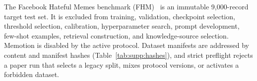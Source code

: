 The Facebook Hateful Memes benchmark (FHM)~\cite{kiela2020hateful} is an
immutable 9,000-record target test set.  It is excluded from training,
validation, checkpoint selection, threshold selection, calibration,
hyperparameter search, prompt development, few-shot examples, retrieval
construction, and knowledge-source selection.  Memotion is disabled by the
active protocol.  Dataset manifests are addressed by content and manifest
hashes (Table~\ref{tab:supp:hashes}), and strict preflight rejects a paper run
that selects a legacy split, mixes protocol versions, or activates a
forbidden dataset.
